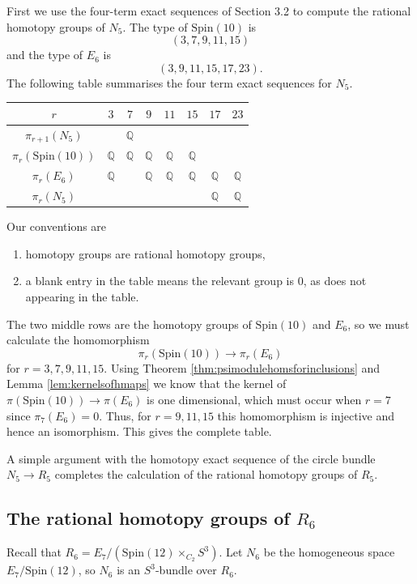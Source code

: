 \documentclass[twoside,a4paper,reqno,11pt]{amsart}
\newcommand{\Q}{\mathbb{Q}}
\newcommand{\Spin}{\mathrm{Spin}}
\begin{document}
First we use the four-term exact sequences of Section 3.2 to compute the rational homotopy groups of $N_5$. The type of $\Spin(10)$ is
\[
(3, 7, 9, 11, 15)
\]
and the type of $E_6$ is
\[
(3, 9, 11, 15, 17, 23).
\]
The following table summarises the four term exact sequences for $N_5$. 
\vspace{\baselineskip}
\begin{center}
\begin{tabular}{ | c | c | c | c | c | c | c | c | }
\hline
$r$  & $3$ & $7$ & $9$ & $11$ & $15$ & $17$ & $23$  \\
\hline
$\pi_{r+1}(N_5)$ & & $\Q$ & &  & & &     \\
\hline
$\pi_{r}(\Spin(10))$ & $\Q$ & $\Q$ & $\Q$ & $\Q$ & $\Q$ & &   \\
\hline
$\pi_{r}(E_6)$ & $\Q$ & &$\Q$ &$\Q$ & $\Q$ &$\Q$ & $\Q$ \\
\hline
$\pi_{r}(N_5)$ &  &  &  &   & & $\Q$ & $\Q$  \\
\hline
\end{tabular}
\end{center}
\vspace{\baselineskip}
Our conventions are
\begin{enumerate}
\item homotopy groups are rational homotopy groups,
\item a blank entry in the table means the relevant group is $0$, as does not appearing in the table.
\end{enumerate}
The two middle rows are the homotopy groups of $\Spin(10)$ and $E_6$, so we must calculate the homomorphism
$$
\pi_r(\Spin(10)) \to \pi_r(E_6)
$$
for $r = 3,7,9,11,15$.  Using Theorem \ref{thm:psimodulehomsforinclusions} and Lemma \ref{lem:kernelsofhmaps} we know that the kernel of $\pi(\Spin(10)) \to \pi(E_6)$ is one dimensional, which must occur when $r=7$ since $\pi_7(E_6) = 0$. Thus, for $r = 9, 11, 15$ this homomorphism is injective and hence an isomorphism. This gives the complete table.

A simple argument with the homotopy exact sequence of the circle bundle $N_5 \to R_5$ completes the calculation of the rational homotopy groups of $R_5$.

\subsection{The rational homotopy groups of $R_6$}
Recall that $R_6 = E_7 /(\Spin(12) \times_{C_2} S^3)$.  Let $N_6$ be the homogeneous space $E_7/\Spin(12)$, so $N_6$ is an $S^3$-bundle over $R_6$. 
\end{document}
